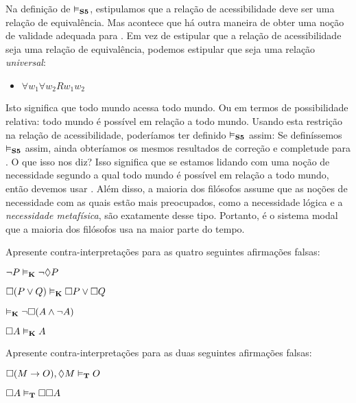 Na definição de  $\vDash_{\mathbf{S5}} $, estipulamos que a relação de acessibilidade deve ser uma relação de equivalência. Mas acontece que há outra maneira de obter uma noção de validade adequada para \mlSfive. Em vez de estipular que a relação de acessibilidade seja uma relação de equivalência, podemos estipular que seja uma relação \emph{universal}:
\begin{itemize}
	\item $\forall w_1\forall w_2Rw_1w_2$
\end{itemize}
Isto significa  que todo mundo acessa todo mundo. Ou em termos de possibilidade relativa: todo mundo é possível em relação a todo mundo. Usando esta restrição na relação de acessibilidade, poderíamos ter definido  $\vDash_{\mathbf{S5}} $ assim:
Se definíssemos $\vDash_{\mathbf{S5}} $ assim, ainda obteríamos os mesmos resultados de correção e completude para \mlSfive{}. O que isso nos diz? Isso significa que se estamos lidando com uma noção de necessidade segundo a qual todo mundo é possível em relação a todo mundo, então devemos usar \mlSfive{}. Além disso, a maioria dos filósofos assume que as noções de necessidade com as quais estão mais preocupados, como a necessidade lógica e a \emph{necessidade metafísica}, são exatamente desse tipo. Portanto, \mlSfive{} é o sistema modal que a maioria dos filósofos usa na maior parte do tempo.
 

\practiceproblems

\problempart
Apresente contra-interpretações para as quatro seguintes afirmações falsas:
\begin{earg}
	\item $\neg P \vDash_{\mathbf{K}} \neg\Diamond P$
	\item $\Box(P \vee Q)\vDash_{\mathbf{K}} \Box P \vee \Box Q$
	\item $\vDash_{\mathbf{K}} \neg \Box (A\wedge \neg A)$
	\item $\Box A\vDash_{\mathbf{K}} A$
\end{earg}

\problempart
Apresente contra-interpretações para as duas seguintes afirmações falsas:
\begin{earg}
	\item $\Box (M\rightarrow O),\Diamond M\vDash_{\mathbf{T}} O$
	\item $\Box A\vDash_{\mathbf{T}} \Box \Box A$
\end{earg}

